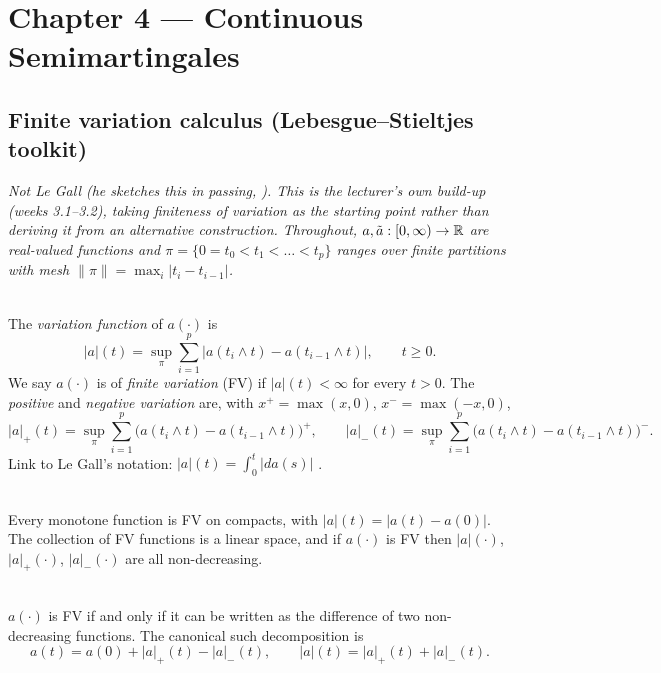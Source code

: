 \section{Chapter 4 --- Continuous Semimartingales}
\setcounter{subsection}{-1}
\subsection{Finite variation calculus (Lebesgue--Stieltjes toolkit)}
\emph{Not Le Gall (he sketches this in passing, ). This is the lecturer's own build-up (weeks 3.1--3.2), taking finiteness of variation as the starting point rather than deriving it from an alternative construction. Throughout, $a,\tilde a:[0,\infty)\to\mathbb{R}$ are real-valued functions and $\pi=\{0=t_0<t_1<\dots<t_p\}$ ranges over finite partitions with mesh $\|\pi\|=\max_i|t_i-t_{i-1}|$.}

\begin{definition} \label{chap4.0:definition-variation}  \\
The \textit{variation function} of $a(\cdot)$ is
$$|a|(t)=\sup_\pi \sum_{i=1}^p\big|a(t_i\wedge t)-a(t_{i-1}\wedge t)\big|, \qquad t\ge0.$$
We say $a(\cdot)$ is of \textit{finite variation} (FV) if $|a|(t)<\infty$ for every $t>0$. The \textit{positive} and \textit{negative variation} are, with $x^+=\max(x,0)$, $x^-=\max(-x,0)$,
$$|a|_+(t)=\sup_\pi\sum_{i=1}^p\big(a(t_i\wedge t)-a(t_{i-1}\wedge t)\big)^+, \qquad |a|_-(t)=\sup_\pi\sum_{i=1}^p\big(a(t_i\wedge t)-a(t_{i-1}\wedge t)\big)^-.$$
Link to Le Gall's notation: $|a|(t)=\int_0^t|da(s)|$ .
\end{definition}

\begin{proposition} \label{chap4.0:proposition-basic_properties_of_variation}
 \\
Every monotone function is FV on compacts, with $|a|(t)=|a(t)-a(0)|$. The collection of FV functions is a linear space, and if $a(\cdot)$ is FV then $|a|(\cdot)$, $|a|_+(\cdot)$, $|a|_-(\cdot)$ are all non-decreasing.
\end{proposition}

\begin{theorem} \label{chap4.0:theorem-jordan_decomposition}  \\
$a(\cdot)$ is FV if and only if it can be written as the difference of two non-decreasing functions. The canonical such decomposition is
$$a(t)=a(0)+|a|_+(t)-|a|_-(t), \qquad |a|(t)=|a|_+(t)+|a|_-(t).$$
\end{theorem}

